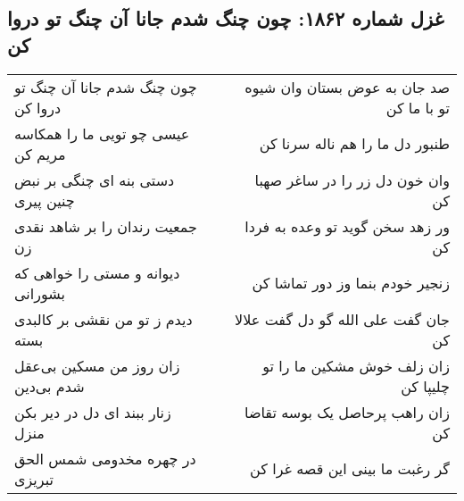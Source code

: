 \begin{center}
\section*{غزل شماره ۱۸۶۲: چون چنگ شدم جانا آن چنگ تو دروا کن}
\label{sec:1862}
\begin{longtable}{l p{0.5cm} r}
چون چنگ شدم جانا آن چنگ تو دروا کن
&&
صد جان به عوض بستان وان شیوه تو با ما کن
\\
عیسی چو تویی ما را همکاسه مریم کن
&&
طنبور دل ما را هم ناله سرنا کن
\\
دستی بنه ای چنگی بر نبض چنین پیری
&&
وان خون دل زر را در ساغر صهبا کن
\\
جمعیت رندان را بر شاهد نقدی زن
&&
ور زهد سخن گوید تو وعده به فردا کن
\\
دیوانه و مستی را خواهی که بشورانی
&&
زنجیر خودم بنما وز دور تماشا کن
\\
دیدم ز تو من نقشی بر کالبدی بسته
&&
جان گفت علی الله گو دل گفت علالا کن
\\
زان روز من مسکین بی‌عقل شدم بی‌دین
&&
زان زلف خوش مشکین ما را تو چلیپا کن
\\
زنار ببند ای دل در دیر بکن منزل
&&
زان راهب پرحاصل یک بوسه تقاضا کن
\\
در چهره مخدومی شمس الحق تبریزی
&&
گر رغبت ما بینی این قصه غرا کن
\\
\end{longtable}
\end{center}
